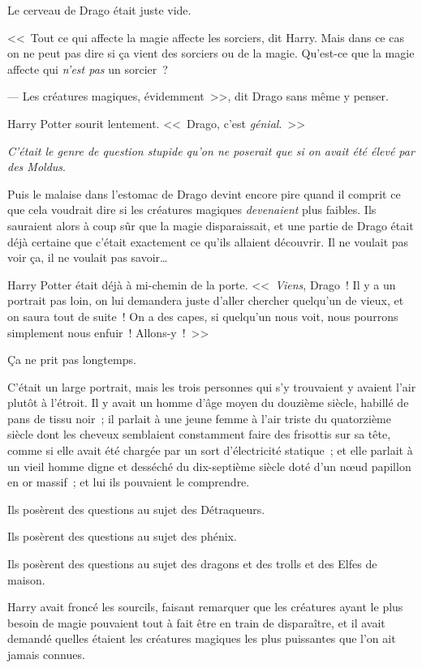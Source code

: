 Le cerveau de Drago était juste vide.

<<~Tout ce qui affecte la magie affecte les sorciers, dit Harry. Mais dans ce cas on ne peut pas dire si ça vient des sorciers ou de la magie. Qu'est-ce que la magie affecte qui \emph{n'est pas} un sorcier~?

--- Les créatures magiques, évidemment~>>, dit Drago sans même y penser.

Harry Potter sourit lentement. <<~Drago, c'est \emph{génial}.~>>

\emph{C'était le genre de question stupide qu'on ne poserait que si on avait été élevé par des Moldus}.

Puis le malaise dans l'estomac de Drago devint encore pire quand il comprit ce que cela voudrait dire si les créatures magiques \emph{devenaient} plus faibles. Ils sauraient alors à coup sûr que la magie disparaissait, et une partie de Drago était déjà certaine que c'était exactement ce qu'ils allaient découvrir. Il ne voulait pas voir ça, il ne voulait pas savoir…

Harry Potter était déjà à mi-chemin de la porte. <<~\emph{Viens}, Drago~! Il y a un portrait pas loin, on lui demandera juste d'aller chercher quelqu'un de vieux, et on saura tout de suite~! On a des capes, si quelqu'un nous voit, nous pourrons simplement nous enfuir~! Allons-y~!~>>

\later

Ça ne prit pas longtemps.

C'était un large portrait, mais les trois personnes qui s'y trouvaient y avaient l'air plutôt à l'étroit. Il y avait un homme d'âge moyen du douzième siècle, habillé de pans de tissu noir~; il parlait à une jeune femme à l'air triste du quatorzième siècle dont les cheveux semblaient constamment faire des frisottis sur sa tête, comme si elle avait été chargée par un sort d'électricité statique~; et elle parlait à un vieil homme digne et desséché du dix-septième siècle doté d'un nœud papillon en or massif~; et lui ils pouvaient le comprendre.

Ils posèrent des questions au sujet des Détraqueurs.

Ils posèrent des questions au sujet des phénix.

Ils posèrent des questions au sujet des dragons et des trolls et des Elfes de maison.

Harry avait froncé les sourcils, faisant remarquer que les créatures ayant le plus besoin de magie pouvaient tout à fait être en train de disparaître, et il avait demandé quelles étaient les créatures magiques les plus puissantes que l'on ait jamais connues.

